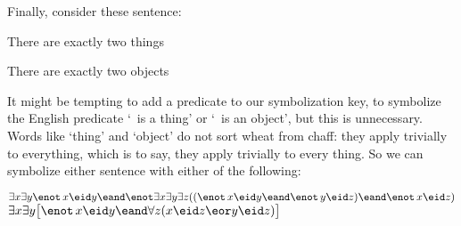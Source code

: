 Finally, consider these sentence:
\begin{earg}
\item[\ex{exactly2things}] There are exactly two things
\item[\ex{exactly2objects}] There are exactly two objects
\end{earg}
It might be tempting to add a predicate to our symbolization key, to symbolize the English predicate `\blank\ is a thing' or `\blank\ is an object', but this is unnecessary. Words like `thing' and `object' do not sort wheat from chaff: they apply trivially to everything, which is to say, they apply trivially to every thing. So we can symbolize either sentence with either of the following:
	\begin{center}
		$\exists x \exists y \enot\, x\eid y \eand \enot \exists x \exists y \exists z ((\enot\, x\eid y \eand \enot\, y\eid z) \eand \enot\, x\eid z)$\\

		$\exists x \exists y \bigl[\enot\, x\eid y \eand \forall z(x\eid z \eor y \eid z)\bigr]$
	\end{center}

